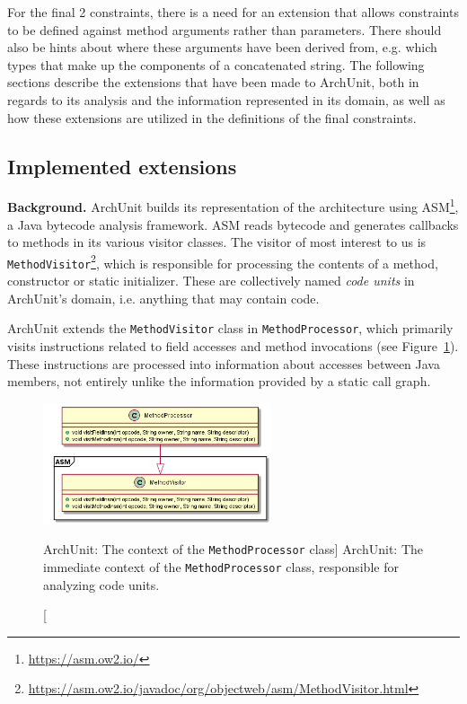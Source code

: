 For the final 2 constraints, there is a need for an extension that allows constraints to be defined against method arguments rather than parameters. There should also be hints about where these arguments have been derived from, e.g. which types that make up the components of a concatenated string. The following sections describe the extensions that have been made to ArchUnit, both in regards to its analysis and the information represented in its domain, as well as how these extensions are utilized in the definitions of the final constraints.

\subsection{Implemented extensions}

\textbf{Background.} ArchUnit builds its representation of the architecture using ASM\footnote{\url{https://asm.ow2.io/}}, a Java bytecode analysis framework. ASM reads bytecode and generates callbacks to methods in its various visitor classes. 
The visitor of most interest to us is \texttt{MethodVisitor}\footnote{\url{https://asm.ow2.io/javadoc/org/objectweb/asm/MethodVisitor.html}}, which is responsible for processing the contents of a method, constructor or static initializer. These are collectively named \textit{code units} in ArchUnit's domain, i.e. anything that may contain code.

ArchUnit extends the \texttt{MethodVisitor} class in \texttt{MethodProcessor}, which primarily visits instructions related to field accesses and method invocations (see Figure~\ref{fig:method_processor_1}). These instructions are processed into information about accesses between Java members, not entirely unlike the information provided by a static call graph.

\begin{figure}[H]
    \centering
    \includegraphics[width=0.6\textwidth]{figure/extension/MethodProcessor1.png}
    \caption
        [ArchUnit: The context of the \texttt{MethodProcessor} class]
        {ArchUnit: The immediate context of the \texttt{MethodProcessor} class, responsible for analyzing code units.}
    \label{fig:method_processor_1}
\end{figure}

